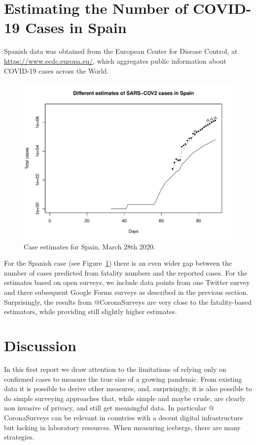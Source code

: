 \documentclass{article}
\begin{document}
\section{Estimating the Number of COVID-19 Cases in Spain}

Spanish data was obtained from the European Center for Disease Control, at \url{https://www.ecdc.europa.eu/}, which aggregates public information about COVID-19 cases across the World. 

\begin{figure}
\begin{center}
\includegraphics[width=.9\linewidth]{EstSPMar28.pdf}
\end{center}
\caption{Case estimates for Spain, March 28th 2020.}
\label{sp}
\end{figure}

For the Spanish case (see Figure~\ref{sp}) there is an even wider gap between the number of cases predicted from fatality numbers and the reported cases. For the estimates based on open surveys, we include data points from one Twitter survey and three subsequent Google Forms surveys as described in the previous section. Surprisingly, the results from $@$CoronaSurveys are very close to the fatality-based estimators, while providing still slightly higher estimates. 

\section{Discussion}

In this first report we draw attention to the limitations of relying only on confirmed cases to measure the true size of a growing pandemic. From existing data it is possible to derive other measures, and, surprisingly, it is also possible to do simple surveying approaches that, while simple and maybe crude, are clearly non invasive of privacy, and still get meaningful data. In particular  $@$CoronaSurveys can be relevant in countries with a decent digital infrastructure but lacking in laboratory resources. When measuring icebergs,  there are many strategies. 
\end{document}
